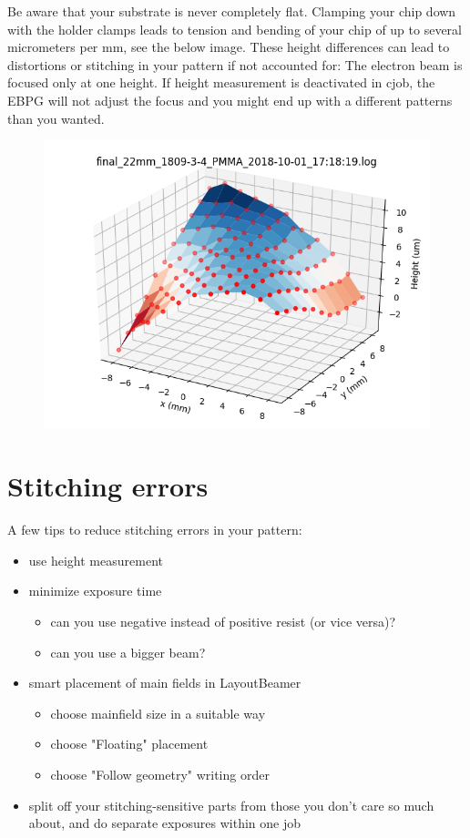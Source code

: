 Be aware that your substrate is never completely flat. Clamping your chip down with the holder clamps leads to tension and bending of your chip of up to several micrometers per mm, see the below image. These height differences can lead to distortions or stitching in your pattern if not accounted for: The electron beam is focused only at one height. If height measurement is deactivated in cjob, the EBPG will not adjust the focus and you might end up with a different patterns than you wanted.

\begin{figure}
	\centering
	\includegraphics[width=0.5\linewidth]{appendix/figs/heightmap}
	\caption{}
	\label{fig:heightmap}
\end{figure}


\section{Stitching errors}

A few tips to reduce stitching errors in your pattern:
\begin{itemize}
	\item use height measurement
	\item minimize exposure time
		\begin{itemize}
		\item can you use negative instead of positive resist (or vice versa)?
		\item can you use a bigger beam?
		\end{itemize}
	\item smart placement of main fields in LayoutBeamer
		\begin{itemize}
		\item choose mainfield size in a suitable way
		\item choose "Floating" placement
		\item choose "Follow geometry" writing order
	\end{itemize}
	\item split off your stitching-sensitive parts from those you don't care so much about, and do separate exposures within one job
\end{itemize}



